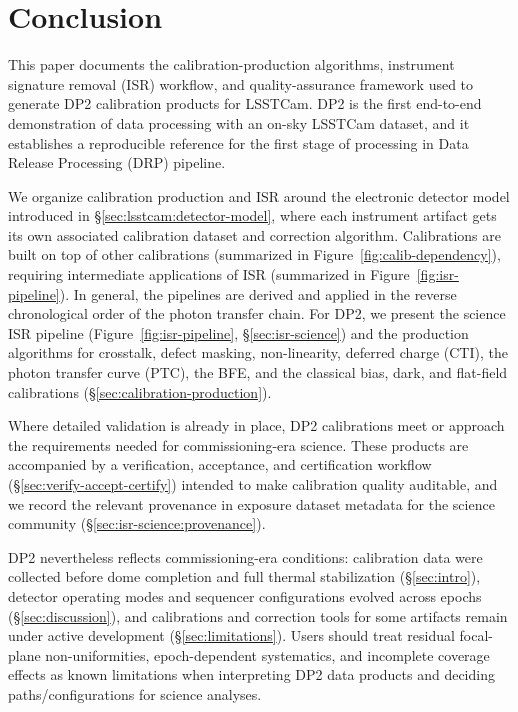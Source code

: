 \section{Conclusion} \label{sec:conclusion}

This paper documents the calibration-production algorithms, instrument signature removal (ISR) workflow, and quality-assurance framework used to generate DP2 calibration products for LSSTCam.
DP2 is the first end-to-end demonstration of data processing with an on-sky LSSTCam dataset, and it establishes a reproducible reference for the first stage of processing in Data Release Processing (DRP) pipeline.

We organize calibration production and ISR around the electronic detector model introduced in \S\ref{sec:lsstcam:detector-model}, where each instrument artifact gets its own associated calibration dataset and correction algorithm. Calibrations are built on top of other calibrations (summarized in Figure~\ref{fig:calib-dependency}), requiring intermediate applications of ISR (summarized in Figure~\ref{fig:isr-pipeline}).
In general, the pipelines are derived and applied in the reverse chronological order of the photon transfer chain.
For DP2, we present the science ISR pipeline (Figure~\ref{fig:isr-pipeline}, \S\ref{sec:isr-science}) and the production algorithms for crosstalk, defect masking, non-linearity, deferred charge (CTI), the photon transfer curve (PTC), the BFE, and the classical bias, dark, and flat-field calibrations (\S\ref{sec:calibration-production}).

Where detailed validation is already in place, DP2 calibrations meet or approach the requirements needed for commissioning-era science.
These products are accompanied by a verification, acceptance, and certification workflow (\S\ref{sec:verify-accept-certify}) intended to make calibration quality auditable, and we record the relevant provenance in exposure dataset metadata for the science community (\S\ref{sec:isr-science:provenance}).

DP2 nevertheless reflects commissioning-era conditions: calibration data were collected before dome completion and full thermal stabilization (\S\ref{sec:intro}), detector operating modes and sequencer configurations evolved across epochs (\S\ref{sec:discussion}), and calibrations and correction tools for some artifacts remain under active development (\S\ref{sec:limitations}).
Users should treat residual focal-plane non-uniformities, epoch-dependent systematics, and incomplete coverage effects as known limitations when interpreting DP2 data products and deciding paths/configurations for science analyses.

